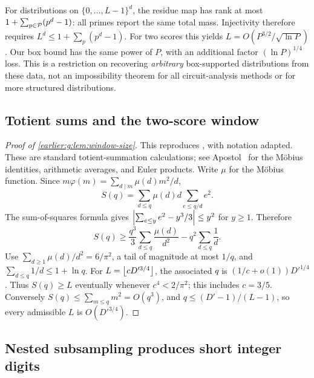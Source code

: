\begin{remark}\label{earlier:g:rem:rank}
For distributions on \(\{0,\ldots,L-1\}^d\), the residue map has
rank at most \(1+\sum_{p\in\mathcal P}(p^d-1)\): all primes report the
same total mass. Injectivity therefore requires
\(L^d\le1+\sum_p(p^d-1)\).
For two scores this yields
\(L=O(P^{3/2}/\sqrt{\ln P})\). Our box bound has the same power
of \(P\), with an additional factor \((\ln P)^{1/4}\) loss.
This is a restriction on recovering \emph{arbitrary} box-supported
distributions from these data, not an impossibility theorem for all
circuit-analysis methods or for more structured distributions.
\end{remark}



\subsection{Totient sums and the two-score window}\label{earlier:g:app:window-size}\label{earlier:gate-window-size}
\begin{proof}[Proof of \cref{earlier:g:lem:window-size}]
This reproduces \cite[Appendix~A]{NagCG}, with notation adapted. These are standard totient-summation calculations; see
Apostol~\cite[Chapters~2--3 and~11]{Apostol76} for the M\"obius
identities, arithmetic averages, and Euler products.
Write \(\mu\) for the M\"obius function. Since
\(m\varphi(m)=\sum_{d\mid m}\mu(d)m^2/d\),
\[
 S(q)=\sum_{d\le q}\mu(d)d\sum_{e\le q/d}e^2.
\]
The sum-of-squares formula gives
\(\left|\sum_{e\le y}e^2-y^3/3\right|\le y^2\) for \(y\ge1\).
Therefore
\[
 S(q)\ge\frac{q^3}{3}\sum_{d\le q}\frac{\mu(d)}{d^2}
          -q^2\sum_{d\le q}\frac1d.
\]
Use \(\sum_{d\ge1}\mu(d)/d^2=6/\pi^2\), a tail of magnitude at most
\(1/q\), and \(\sum_{d\le q}1/d\le1+\ln q\).
For \(L=\left\lfloor cD'^{3/4}\right\rfloor\), the associated \(q\) is
\((1/c+o(1))D'^{1/4}\). Thus \(S(q)\ge L\) eventually whenever
\(c^4<2/\pi^2\); this includes \(c=3/5\).
Conversely \(S(q)\le\sum_{m\le q}m^2=O(q^3)\), and
\(q\le(D'-1)/(L-1)\), so every admissible \(L\) is
\(O(D'^{3/4})\).
\end{proof}




\subsection{Nested subsampling produces short integer digits}\label{earlier:g:sec:chains}\label{earlier:gate-chain}

